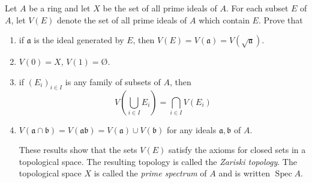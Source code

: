 \documentclass[12 pt, letterpaper]{hmcpset}
\begin{document}
\pagebreak

\begin{problem}
	Let $A$ be a ring and let $X$ be the set of all prime ideals of $A$. For each subset $E$ of $A$, let $V(E)$ denote the set of all prime ideals of $A$ which contain $E$. Prove that
	\begin{enumerate}[label = (\roman*)]
		\item if $\mathfrak{a}$ is the ideal generated by $E$, then $V(E) = V(\mathfrak{a}) = V(\sqrt{\mathfrak{a}})$. 
		\item $V(0) = X$, $V(1) = \text{\O}$.
		\item if $(E_{i})_{i \in I}$ is any family of subsets of $A$, then
			\[
				V \left ( \bigcup_{i \in I} E_{i} \right ) = \bigcap_{i \in I} V(E_{i})
			\]
		\item $V(\mathfrak{a} \cap \mathfrak{b}) = V(\mathfrak{a} \mathfrak{b}) = V(\mathfrak{a}) \cup V(\mathfrak{b})$ for any ideals $\mathfrak{a}, \mathfrak{b}$ of $A$.

			These results show that the sets $V(E)$ satisfy the axioms for closed sets in a topological space. The resulting topology is called the \emph{Zariski topology}. The topological space $X$ is called the \emph{prime spectrum} of $A$ and is written $\operatorname{Spec} A$.
	\end{enumerate}
\end{problem}
\end{document}

